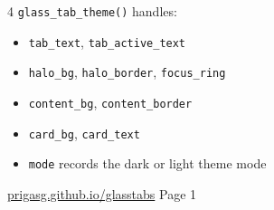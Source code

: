 \documentclass[9pt,a4paper]{article}
\newcommand{\gtfn}[1]{\texttt{\footnotesize\color{codekw}#1()}}
\newcommand{\gtarg}[1]{\texttt{\footnotesize\color{gtgreen}#1}}
\begin{document}
\begin{multicols*}{4}
\gtfn{glass\_tab\_theme} handles:
\begin{itemize}
  \item \gtarg{tab\_text}, \gtarg{tab\_active\_text}
  \item \gtarg{halo\_bg}, \gtarg{halo\_border}, \gtarg{focus\_ring}
  \item \gtarg{content\_bg}, \gtarg{content\_border}
  \item \gtarg{card\_bg}, \gtarg{card\_text}
  \item \gtarg{mode} records the dark or light theme mode
\end{itemize}

\vfill
{\tiny\color{gtgray}
\href{https://prigasg.github.io/glasstabs/}{prigasg.github.io/glasstabs}
\hfill Page 1}
\end{multicols*}
\end{document}
